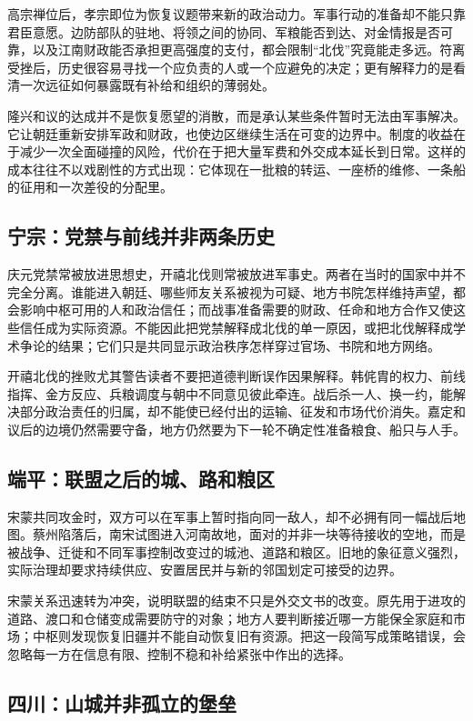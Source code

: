 高宗禅位后，孝宗即位为恢复议题带来新的政治动力。军事行动的准备却不能只靠君臣意愿。边防部队的驻地、将领之间的协同、军粮能否到达、对金情报是否可靠，以及江南财政能否承担更高强度的支付，都会限制“北伐”究竟能走多远。符离受挫后，历史很容易寻找一个应负责的人或一个应避免的决定；更有解释力的是看清一次远征如何暴露既有补给和组织的薄弱处。

隆兴和议的达成并不是恢复愿望的消散，而是承认某些条件暂时无法由军事解决。它让朝廷重新安排军政和财政，也使边区继续生活在可变的边界中。制度的收益在于减少一次全面碰撞的风险，代价在于把大量军费和外交成本延长到日常。这样的成本往往不以戏剧性的方式出现：它体现在一批粮的转运、一座桥的维修、一条船的征用和一次差役的分配里。

\subsection{宁宗：党禁与前线并非两条历史}

庆元党禁常被放进思想史，开禧北伐则常被放进军事史。两者在当时的国家中并不完全分离。谁能进入朝廷、哪些师友关系被视为可疑、地方书院怎样维持声望，都会影响中枢可用的人和政治信任；而战事准备需要的财政、任命和地方合作又使这些信任成为实际资源。不能因此把党禁解释成北伐的单一原因，或把北伐解释成学术争论的结果；它们只是共同显示政治秩序怎样穿过官场、书院和地方网络。

开禧北伐的挫败尤其警告读者不要把道德判断误作因果解释。韩侂胄的权力、前线指挥、金方反应、兵粮调度与朝中不同意见彼此牵连。战后杀一人、换一约，能解决部分政治责任的归属，却不能使已经付出的运输、征发和市场代价消失。嘉定和议后的边境仍然需要守备，地方仍然要为下一轮不确定性准备粮食、船只与人手。

\subsection{端平：联盟之后的城、路和粮区}

宋蒙共同攻金时，双方可以在军事上暂时指向同一敌人，却不必拥有同一幅战后地图。蔡州陷落后，南宋试图进入河南故地，面对的并非一块等待接收的空地，而是被战争、迁徙和不同军事控制改变过的城池、道路和粮区。旧地的象征意义强烈，实际治理却要求持续供应、安置居民并与新的邻国划定可接受的边界。

宋蒙关系迅速转为冲突，说明联盟的结束不只是外交文书的改变。原先用于进攻的道路、渡口和仓储变成需要防守的对象；地方人要判断接近哪一方能保全家庭和市场；中枢则发现恢复旧疆并不能自动恢复旧有资源。把这一段简写成策略错误，会忽略每一方在信息有限、控制不稳和补给紧张中作出的选择。

\subsection{四川：山城并非孤立的堡垒}

